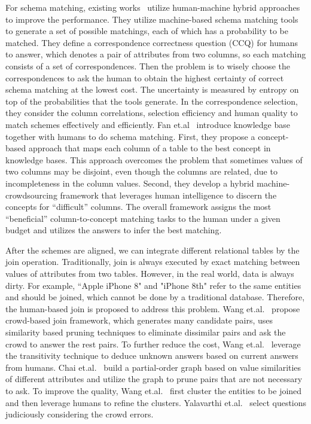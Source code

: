 For schema matching, existing works~\cite{DBLP:journals/pvldb/ZhangCJC13} utilize human-machine hybrid approaches to improve the performance. They utilize machine-based  schema matching tools to generate a set of possible matchings, each of which has a probability to be matched. 
They define a correspondence correctness question (CCQ) for humans to answer, which denotes a pair of attributes from two columns, so each matching consists of a set of correspondences. Then the problem is to wisely choose  the correspondences to ask the human to obtain the highest certainty of correct schema matching at the lowest cost. The uncertainty is measured by entropy on top of the probabilities that the tools generate. 
In the correspondence selection, they consider the column correlations, selection efficiency and human quality to match schemes effectively and efficiently. 
Fan et.al~\cite{DBLP:conf/icde/FanLOTZ14} introduce knowledge base together with humans to do schema matching. First, they propose a concept-based approach that maps each column of a  table to the best concept in knowledge bases. This approach overcomes the problem that sometimes values of two columns may be disjoint, even though the columns are related, due to incompleteness in the column values. Second, they develop a hybrid machine-crowdsourcing framework that leverages human intelligence to discern the concepts for ``difficult'' columns. The overall framework assigns the most ``beneficial'' column-to-concept matching tasks to the human under a given budget and utilizes the answers to  infer the best matching. 

After the schemes are aligned, we can integrate different relational tables by the join operation. Traditionally, join is always executed by exact matching between values of attributes from two tables. However, in the real world,  data is  always dirty. For example, ``Apple iPhone 8" and "iPhone 8th" refer to the same entities and should be joined, which cannot be done by a traditional database. Therefore, the human-based join is proposed to address this problem. Wang et.al.~\cite{DBLP:crowder} propose  crowd-based join framework, which generates many candidate pairs, uses similarity based pruning techniques to eliminate dissimilar pairs and ask the crowd to answer the rest  pairs. To further reduce the cost, Wang et.al.~\cite{DBLP:transitivity} leverage the transitivity technique to deduce unknown answers based on current answers from humans. Chai et.al.~\cite{DBLP:journals/vldb/ChaiLLDF18, DBLP:conf/sigmod/ChaiLLDF16} build a partial-order graph based on value similarities of different attributes and utilize the graph to prune pairs that are not necessary to ask. To improve the quality,  Wang et.al.~\cite{DBLP:conf/sigmod/WangXL15} first cluster the entities to be joined  and then leverage humans to refine the clusters. Yalavarthi et.al.~\cite{DBLP:conf/cikm/YalavarthiKK17} select questions judiciously considering the crowd errors.





